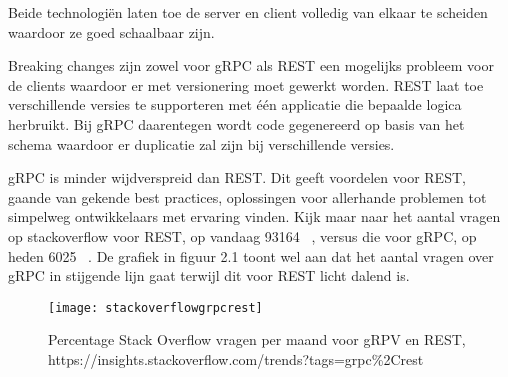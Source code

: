 Beide technologiën laten toe de server en client volledig van elkaar te scheiden waardoor ze goed schaalbaar zijn.

Breaking changes zijn zowel voor gRPC als REST een mogelijks probleem voor de clients waardoor er met versionering moet gewerkt worden.
REST laat toe verschillende versies te supporteren met één applicatie die bepaalde logica herbruikt. Bij gRPC daarentegen wordt code gegenereerd op basis van
het schema waardoor er duplicatie zal zijn bij verschillende versies.
~\autocite{grpcversion}

gRPC is minder wijdverspreid dan REST. Dit geeft voordelen voor REST, gaande van gekende best practices, oplossingen voor allerhande problemen
tot simpelweg ontwikkelaars met ervaring vinden. Kijk maar naar het aantal vragen op stackoverflow voor REST, op vandaag 93164 ~\parencite{stackrest},
versus die voor gRPC, op heden 6025 ~\parencite{stackgrpc}. De grafiek in figuur 2.1 toont wel aan dat het aantal vragen over gRPC in stijgende lijn gaat terwijl
dit voor REST licht dalend is.
\begin{figure}[ht]
    \centering
    \texttt{[image: stackoverflowgrpcrest]}
    \caption{Percentage Stack Overflow vragen per maand voor gRPV en REST,\newline
        https://insights.stackoverflow.com/trends?tags=grpc\%2Crest}
\end{figure}\\